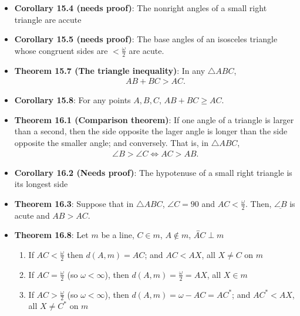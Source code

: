 \documentclass{report}
\begin{document}
\begin{itemize}
        \item \textbf{Corollary 15.4 (needs proof)}: The nonright angles of a small right triangle are accute
        \item \textbf{Corollary 15.5 (needs proof)}: The base angles of an isosceles triangle whose congruent sides are $< \frac{\omega}{2}$ are acute.
        \item \textbf{Theorem 15.7 (The triangle inequality)}: In any $\triangle ABC$, 
            \begin{align*}
                AB + BC > AC
            .\end{align*}
        \item \textbf{Corollary 15.8}: For any points $A,B,C$, $AB + BC \geq AC$. 
        \item \textbf{Theorem 16.1 (Comparison theorem)}: If one angle of a triangle is larger than a second, then the side opposite the lager angle is longer than the side opposite the smaller angle; and conversely. 
            \bigbreak \noindent 
            That is, in $\triangle ABC$, 
            \begin{align*}
                \angle B > \angle C \iff AC > AB
            .\end{align*}
        \item \textbf{Corollary 16.2 (Needs proof)}: The hypotenuse of a small right triangle is its longest side
        \item \textbf{Theorem 16.3}: Suppose that in $\triangle ABC$, $ \angle C = 90$ and $AC  < \frac{\omega}{2} $. Then, $\underline{\angle B}$ is acute and $AB  > AC$.
        \item \textbf{Theorem 16.8}: Let $m$ be a line, $C \in m$, $A \not\in m$, $\overleftrightarrow{AC} \perp m$
            \begin{enumerate}[label=(\alph*)]
                \item If $AC < \frac{\omega}{2}$ then $d(A,m) = AC$; and $AC < AX$, all $X \ne C$ on $m$
                \item If $AC = \frac{\omega}{2}$ (so $\omega<\infty$), then $d(A,m) = \frac{\omega}{2} = AX$, all $X \in m$
                \item If $AC > \frac{\omega}{2}$ (so $\omega<\infty$), then $d(A,m)  = \omega - AC = AC^{*}$; and $AC^{*} < AX$, all $X \ne C^{*}$ on $m$
            \end{enumerate}
            \bigbreak \noindent 


    \end{itemize}
\end{document}
